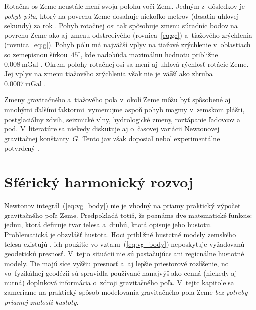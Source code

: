 \documentclass[a4paper, 12pt]{book}
\begin{document}
Rotačná os Zeme neustále mení svoju polohu voči Zemi.  Jedným z~dôsledkov je 
\emph{pohyb pólu}, ktorý na povrchu Zeme dosahuje niekoľko metrov (desatín 
uhlovej sekundy) za rok \parencite{MoritzPhysicalGeodesy}.  Pohyb rotačnej osi 
tak spôsobuje zmenu súradníc bodov na povrchu Zeme ako aj~zmenu odstredivého 
(rovnica~\ref{eq:gc}) a~tiažového zrýchlenia (rovnica~\ref{eq:g}).  Pohyb pólu 
má najväčší vplyv na tiažové zrýchlenie v~oblastiach so zemepisnou 
šírkou~$45^{\circ}$, kde nadobúda maximálnu hodnotu približne~$0.008\ 
\mathrm{mGal}$ \parencite{Torge1989}.  Okrem polohy rotačnej osi sa mení aj 
uhlová rýchlosť rotácie Zeme.  Jej vplyv na zmenu tiažového zrýchlenia však nie 
je väčší ako zhruba~$0.0007\ \mathrm{mGal}$ \parencite{Torge1989}.

Zmeny gravitačného a~tiažového poľa v~okolí Zeme môžu byť spôsobené aj mnohými 
ďalšími faktormi, vymenujme aspoň pohyb magmy v~zemskom plášti, postglaciálny 
zdvih, seizmické vlny, hydrologické zmeny, roztápanie ľadovcov a pod.  
V~literatúre sa niekedy diskutuje aj o~časovej variácii Newtonovej gravitačnej 
konštanty~$G$.  Tento jav však doposiaľ nebol experimentálne potvrdený 
\parencite{Torge1989}.







\chapter{Sférický harmonický rozvoj}
\label{sec:spherical_harmonic_expansion}

Newtonov integrál~(\ref{eq:vg_body}) nie je vhodný na priamy praktický výpočet 
gravitačného poľa Zeme.  Predpokladá totiž, že poznáme dve matematické funkcie: 
jednu, ktorá definuje tvar telesa a~druhú, ktorá opisuje jeho hustotu.  
Problematická je obzvlášť hustota.  Hoci približné hustotné modely zemského 
telesa existujú \parencite[napríklad][]{Dziewonski1981}, ich použitie vo 
vzťahu~(\ref{eq:vg_body}) neposkytuje vyžadovanú geodetickú presnosť.  V~tejto 
situácii nie sú postačujúce ani regionálne hustotné modely.  Tie majú síce 
vyššiu presnosť a~aj lepšie priestorové rozlíšenie, no vo~fyzikálnej geodézii 
sú spravidla používané nanajvýš ako cenná (niekedy aj nutná) doplnková 
informácia o~zdroji gravitačného poľa.  V~tejto kapitole sa zameriame na 
praktický spôsob modelovania gravitačného poľa Zeme \emph{bez potreby priamej 
znalosti hustoty}.
\end{document}
